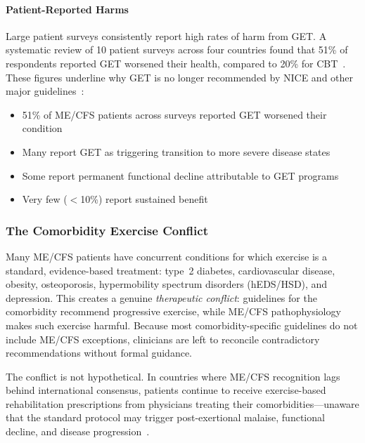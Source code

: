 \paragraph{Patient-Reported Harms}

\begin{warning}
Large patient surveys consistently report high rates of harm from GET. A systematic review of 10 patient surveys across four countries found that 51\% of respondents reported GET worsened their health, compared to 20\% for CBT~\cite{Kindlon2011GET}. These figures underline why GET is no longer recommended by NICE and other major guidelines~\cite{NICE2021mecfs}:
\begin{itemize}
    \item 51\% of ME/CFS patients across surveys reported GET worsened their condition~\cite{Kindlon2011GET}
    \item Many report GET as triggering transition to more severe disease states
    \item Some report permanent functional decline attributable to GET programs
    \item Very few ($<$10\%) report sustained benefit
\end{itemize}
\end{warning}

\subsubsection{The Comorbidity Exercise Conflict}
\label{sec:comorbidity-exercise-conflict}

Many ME/CFS patients have concurrent conditions for which exercise is a
standard, evidence-based treatment: type~2 diabetes, cardiovascular disease,
obesity, osteoporosis, hypermobility spectrum disorders (hEDS/HSD), and
depression. This creates a genuine \emph{therapeutic conflict}: guidelines for
the comorbidity recommend progressive exercise, while ME/CFS pathophysiology
makes such exercise harmful. Because most comorbidity-specific guidelines do
not include ME/CFS exceptions, clinicians are left to reconcile contradictory
recommendations without formal guidance.

The conflict is not hypothetical. In countries where ME/CFS recognition lags
behind international consensus, patients continue to receive exercise-based
rehabilitation prescriptions from physicians treating their
comorbidities---unaware that the standard protocol may trigger
post-exertional malaise, functional decline, and disease
progression~\cite{Kindlon2011GET, NICE2021mecfs, Twisk2009CBTGETharm,
Stallard2026handi}.

